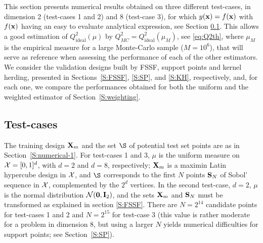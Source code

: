 This section presents numerical results obtained on three different test-cases, in dimension 2 (test-cases 1 and 2) and 8 (test-case 3), for which $y({\bf x})=f({\bf x})$ with $f({\bf x})$ having an easy to evaluate analytical expression, see Section \ref{sec:testCases}. This allows a good  estimation of $Q_{\mathrm{ideal}}^2(\mu)$ by $Q_{MC}^2=Q_{\mathrm{ideal}}^2(\mu_M)$, see \eqref{eq:Q2th}, where $\mu_M$ is the empirical measure for a large Monte-Carlo sample ($M=10^6$), that will serve as  reference when assessing the performance of each of the other estimators. We consider the validation designs built by FSSF, support points and kernel herding, presented in Sections~\ref{S:FSSF}, \ref{S:SP}, and \ref{S:KH}, respectively, and, 
for each one, we compare the performances obtained for both the uniform and the weighted estimator of Section~\ref{S:weighting}. 

\subsection{Test-cases} \label{sec:testCases}

The training  design ${\bf X}_m$ and the set $\S$  of potential test set points are as in Section~\ref{S:numerical-1}. For test-cases 1 and 3, $\mu$ is the uniform measure on $\mathcal{X}=[0,1]^d$, with $d=2$ and $d=8$, respectively; ${\bf X}_m$ is a maximin Latin hypercube design in $\mathcal{X}$, and $\S$ corresponds to the first $N$ points $\mathbf{S}_N$ of Sobol' sequence in $\mathcal{X}$, complemented by the $2^d$ vertices. In the second test-case, $d=2$, $\mu$ is  the normal distribution $\SN(\0b,\Ib_2)$, and the sets ${\bf X}_m$ and $\mathbf{S}_N$ must be transformed as explained in section \ref{S:FSSF}. There are $N=2^{14}$ candidate points for test-cases 1 and 2 and $N=2^{15}$ for test-case 3 (this value is rather moderate for a problem in dimension 8, but using a larger $N$ yields numerical difficulties for support points; see Section~\ref{S:SP}). 


